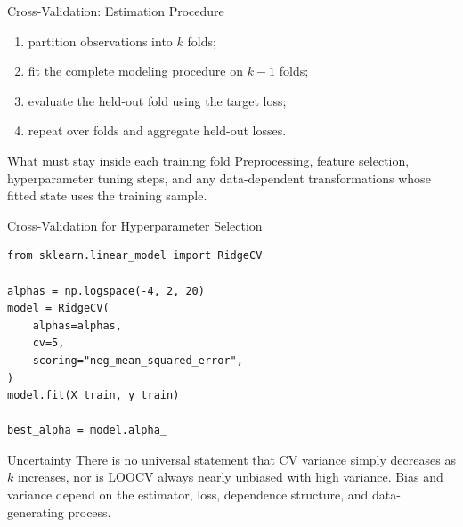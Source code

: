 \documentclass[aspectratio=169,11pt]{beamer}
\begin{document}
\begin{frame}{Cross-Validation: Estimation Procedure}
\begin{enumerate}
  \item partition observations into $k$ folds;
  \item fit the complete modeling procedure on $k-1$ folds;
  \item evaluate the held-out fold using the target loss;
  \item repeat over folds and aggregate held-out losses.
\end{enumerate}

\begin{block}{What must stay inside each training fold}
Preprocessing, feature selection, hyperparameter tuning steps, and any data-dependent transformations whose fitted state uses the training sample.
\end{block}
\end{frame}

\begin{frame}[fragile]{Cross-Validation for Hyperparameter Selection}
\begin{lstlisting}[style=code,basicstyle=\ttfamily\small]
from sklearn.linear_model import RidgeCV

alphas = np.logspace(-4, 2, 20)
model = RidgeCV(
    alphas=alphas,
    cv=5,
    scoring="neg_mean_squared_error",
)
model.fit(X_train, y_train)

best_alpha = model.alpha_
\end{lstlisting}

\begin{alertblock}{Uncertainty}
There is no universal statement that CV variance simply decreases as $k$ increases, nor is LOOCV always nearly unbiased with high variance. Bias and variance depend on the estimator, loss, dependence structure, and data-generating process.
\end{alertblock}
\end{frame}
\end{document}

